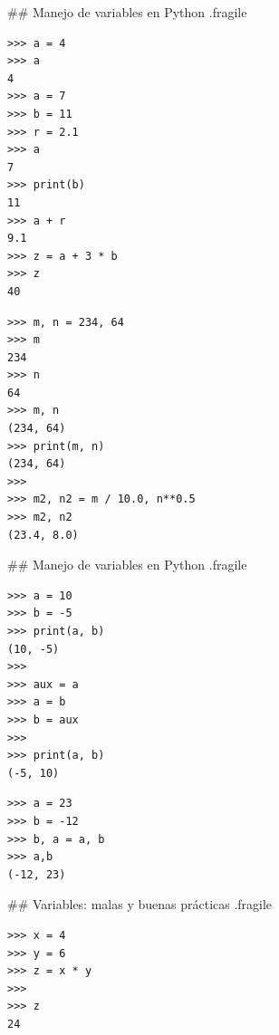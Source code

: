 ## Manejo de variables en Python {.fragile}

\vspace{-3ex}

\bgncolumns
{}


\begin{lstlisting}
>>> a = 4
>>> a
4
>>> a = 7
>>> b = 11
>>> r = 2.1
>>> a
7
>>> print(b)
11
>>> a + r
9.1
>>> z = a + 3 * b
>>> z
40
\end{lstlisting}



\begin{lstlisting}
>>> m, n = 234, 64
>>> m
234
>>> n
64
>>> m, n
(234, 64)
>>> print(m, n)
(234, 64)
>>>
>>> m2, n2 = m / 10.0, n**0.5
>>> m2, n2
(23.4, 8.0)
\end{lstlisting}
\trmcolumns

## Manejo de variables en Python {.fragile}

\vspace{-3ex}

\bgncolumns



\begin{lstlisting}
>>> a = 10
>>> b = -5
>>> print(a, b)
(10, -5)
>>> 
>>> aux = a
>>> a = b
>>> b = aux
>>> 
>>> print(a, b)
(-5, 10)
\end{lstlisting}



\begin{lstlisting}
>>> a = 23
>>> b = -12
>>> b, a = a, b
>>> a,b
(-12, 23)
\end{lstlisting}

\trmcolumns

## Variables: malas y buenas prácticas {.fragile}

\vspace{-2ex}

\bgncolumns


\begin{lstlisting}
>>> x = 4
>>> y = 6
>>> z = x * y
>>>
>>> z
24
\end{lstlisting}

